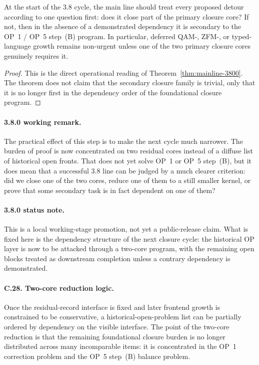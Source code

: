 \begin{corollary}
\label{cor:mainline-3800}
At the start of the 3.8 cycle, the main line should treat every proposed detour according to one question first: does it close part of the primary closure core? If not, then in the absence of a demonstrated dependency it is secondary to the OP~1 / OP~5 step~(B) program. In particular, deferred QAM-, ZFM-, or typed-language growth remains non-urgent unless one of the two primary closure cores genuinely requires it.
\end{corollary}

\begin{proof}
This is the direct operational reading of Theorem~\ref{thm:mainline-3800}. The theorem does not claim that the secondary closure family is trivial, only that it is no longer first in the dependency order of the foundational closure program.
\end{proof}

\paragraph{3.8.0 working remark.}
The practical effect of this step is to make the next cycle much narrower. The burden of proof is now concentrated on two residual cores instead of a diffuse list of historical open fronts. That does not yet solve OP~1 or OP~5 step~(B), but it does mean that a successful 3.8 line can be judged by a much clearer criterion: did we close one of the two cores, reduce one of them to a still smaller kernel, or prove that some secondary task is in fact dependent on one of them?

\paragraph{3.8.0 status note.}
This is a local working-stage promotion, not yet a public-release claim. What is fixed here is the dependency structure of the next closure cycle: the historical OP layer is now to be attacked through a two-core program, with the remaining open blocks treated as downstream completion unless a contrary dependency is demonstrated.

\paragraph{C.28. Two-core reduction logic.}
Once the residual-record interface is fixed and later frontend growth is constrained to be conservative, a historical-open-problem list can be partially ordered by dependency on the visible interface. The point of the two-core reduction is that the remaining foundational closure burden is no longer distributed across many incomparable items: it is concentrated in the OP~1 correction problem and the OP~5 step~(B) balance problem.

